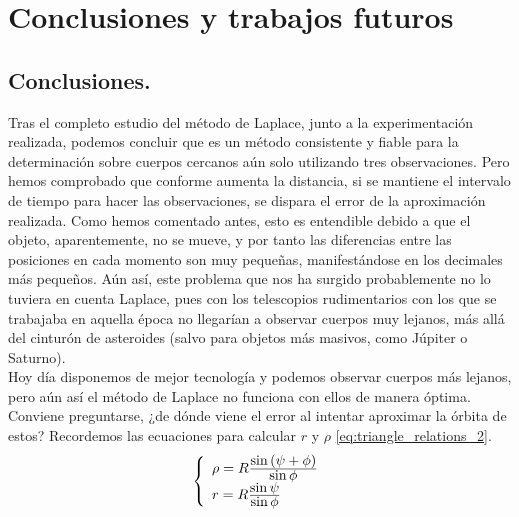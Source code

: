 \chapter{Conclusiones y trabajos futuros}
\section{Conclusiones.}
Tras el completo estudio del método de Laplace, junto a la experimentación realizada, podemos concluir que es un método consistente y fiable para la determinación sobre cuerpos cercanos aún solo utilizando tres observaciones. Pero hemos comprobado que conforme aumenta la distancia, si se mantiene el intervalo de tiempo para hacer las observaciones, se dispara el error de la aproximación realizada. Como hemos comentado antes, esto es entendible debido a que el objeto, aparentemente, no se mueve, y por tanto las diferencias entre las posiciones en cada momento son muy pequeñas, manifestándose en los decimales más pequeños. Aún así, este problema que nos ha surgido probablemente no lo tuviera en cuenta Laplace, pues con los telescopios rudimentarios con los que se trabajaba en aquella época no llegarían a observar cuerpos muy lejanos, más allá del cinturón de asteroides (salvo para objetos más masivos, como Júpiter o Saturno).\\

Hoy día disponemos de mejor tecnología y podemos observar cuerpos más lejanos, pero aún así el método de Laplace no funciona con ellos de manera óptima. Conviene preguntarse, ¿de dónde viene el error al intentar aproximar la órbita de estos? Recordemos las ecuaciones para calcular $r$ y $\rho$ \eqref{eq:triangle_relations_2}.
\[
\left\{
\begin{array}{l}
	\rho=R\frac{\displaystyle \sin{(\psi+\phi)}}{\displaystyle \sin{\phi}}\\
	r=R\frac{\displaystyle \sin{\psi}}{\displaystyle \sin{\phi}}
\end{array}
\right.
\]

